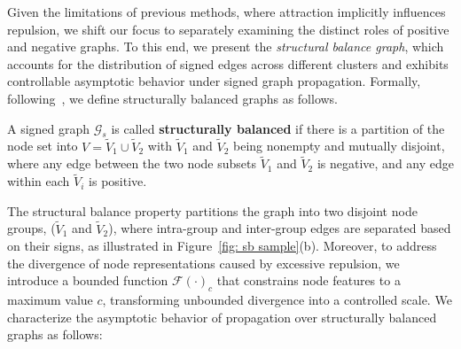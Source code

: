 Given the limitations of previous methods, where attraction implicitly influences repulsion, we shift our focus to separately examining the distinct roles of positive and negative graphs.
To this end, we present the \emph{structural balance graph}, which accounts for the distribution of signed edges across different clusters and exhibits controllable asymptotic behavior under signed graph propagation. 
Formally, following~\citet{signed_dynamics_paper_review,structuralbalance}, we define structurally balanced graphs as follows. 
\begin{definition}
    A signed graph $\mathcal{G}_s$ is called \textbf{structurally balanced} if there is a partition of the node set into \( V = \tilde{V}_1 \cup \tilde{V}_2 \) with \( \tilde{V}_1 \) and \( \tilde{V}_2 \) being nonempty and mutually disjoint, where any edge between the two node subsets \( \tilde{V}_1 \) and \( \tilde{V}_2 \) is negative, and any edge within each \( \tilde{V}_i \) is positive.
    \label{def: struct balance}
\end{definition}

The structural balance property partitions the graph into two disjoint node groups, (\( \tilde{V}_1 \) and \( \tilde{V}_2 \)), where intra-group and inter-group edges are separated based on their signs, as illustrated in Figure~\ref{fig: sb sample}(b).
Moreover, to address the divergence of node representations caused by excessive repulsion, we introduce a bounded function $\mathcal{F}(\cdot)_c$ that constrains node features to a maximum value \(c\), transforming unbounded divergence into a controlled scale.
We characterize the asymptotic behavior of propagation over structurally balanced graphs as follows: 


